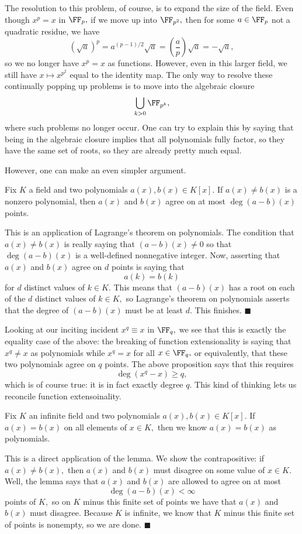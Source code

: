 The resolution to this problem, of course, is to expand the size of the field. Even though $x^p=x$ in $\FF_p,$ if we move up into $\FF_{p^2},$ then for some $a\in\FF_p$ not a quadratic residue, we have
\[\left(\sqrt a\right)^p=a^{(p-1)/2}\sqrt a=\left(\frac ap\right)\sqrt a=-\sqrt a,\]
so we no longer have $x^p=x$ as functions. However, even in this larger field, we still have $x\mapsto x^{p^2}$ equal to the identity map. The only way to resolve these continually popping up problems is to move into the algebraic closure
\[\bigcup_{k>0}\FF_{p^k},\]
where such problems no longer occur. One can try to explain this by saying that being in the algebraic closure implies that all polynomials fully factor, so they have the same set of roots, so they are already pretty much equal.

However, one can make an even simpler argument.
\begin{lemma}
    Fix $K$ a field and two polynomials $a(x),b(x)\in K[x].$ If $a(x)\ne b(x)$ is a nonzero polynomial, then $a(x)$ and $b(x)$ agree on at most $\deg(a-b)(x)$ points.
\end{lemma}
This is an application of Lagrange's theorem on polynomials. The condition that $a(x)\ne b(x)$ is really saying that $(a-b)(x)\ne0$ so that $\deg(a-b)(x)$ is a well-defined nonnegative integer. Now, asserting that $a(x)$ and $b(x)$ agree on $d$ points is saying that
\[a(k)=b(k)\]
for $d$ distinct values of $k\in K.$ This means that $(a-b)(x)$ has a root on each of the $d$ distinct values of $k\in K,$ so Lagrange's theorem on polynomials asserts that the degree of $(a-b)(x)$ must be at least $d.$ This finishes. $\blacksquare$

Looking at our inciting incident $x^q\equiv x$ in $\FF_q,$ we see that this is exactly the equality case of the above: the breaking of function extensionality is saying that $x^q\ne x$ as polynomials while $x^q=x$ for all $x\in\FF_q,$ or equivalently, that these two polynomials agree on $q$ points. The above proposition says that this requires
\[\deg\left(x^q-x\right)\ge q,\]
which is of course true: it is in fact exactly degree $q.$ This kind of thinking lets us reconcile function extensoinality.
\begin{proposition}
    Fix $K$ an infinite field and two polynomials $a(x),b(x)\in K[x].$ If $a(x)=b(x)$ on all elements of $x\in K,$ then we know $a(x)=b(x)$ as polynomials.
\end{proposition}
This is a direct application of the lemma. We show the contrapositive: if $a(x)\ne b(x),$ then $a(x)$ and $b(x)$ must disagree on some value of $x\in K.$ Well, the lemma says that $a(x)$ and $b(x)$ are allowed to agree on at most
\[\deg(a-b)(x)<\infty\]
points of $K,$ so on $K$ minus this finite set of points we have that $a(x)$ and $b(x)$ must disagree. Because $K$ is infinite, we know that $K$ minus this finite set of points is nonempty, so we are done. $\blacksquare$

